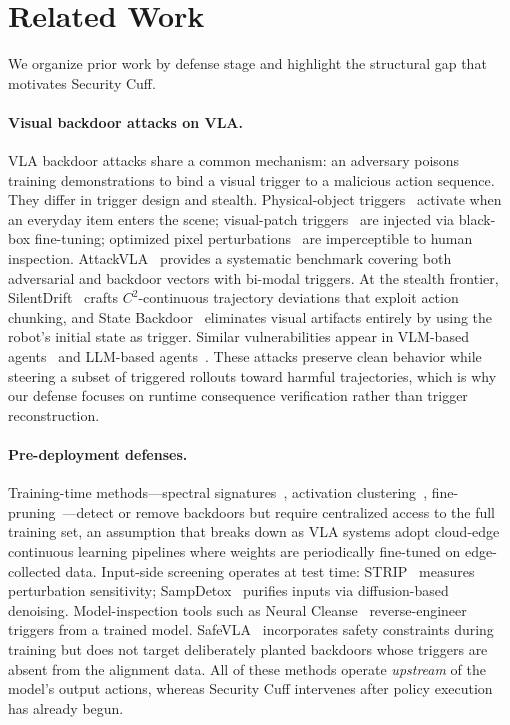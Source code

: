 \section{Related Work}
\label{sec:related}

We organize prior work by defense stage and highlight the
structural gap that motivates Security Cuff.

\paragraph{Visual backdoor attacks on VLA.}
VLA backdoor attacks share a common mechanism: an adversary poisons
training demonstrations to bind a visual trigger to a malicious
action sequence.
They differ in trigger design and stealth.
Physical-object triggers~\citep{goba} activate when an everyday
item enters the scene; visual-patch triggers~\citep{tabvla} are
injected via black-box fine-tuning; optimized pixel
perturbations~\citep{badvla} are imperceptible to human inspection.
AttackVLA~\citep{attackvla} provides a systematic benchmark
covering both adversarial and backdoor vectors with bi-modal
triggers.
At the stealth frontier,
SilentDrift~\citep{silentdrift} crafts $C^2$-continuous trajectory
deviations that exploit action chunking, and
State Backdoor~\citep{statebackdoor} eliminates visual artifacts
entirely by using the robot's initial state as trigger.
Similar vulnerabilities appear in VLM-based
agents~\citep{beat,trojanrobot} and LLM-based
agents~\citep{contextbackdoor}.
These attacks preserve clean behavior while steering a subset of
triggered rollouts toward harmful trajectories, which is why our
defense focuses on runtime consequence verification rather than
trigger reconstruction.

\paragraph{Pre-deployment defenses.}
Training-time methods---spectral
signatures~\citep{tran2018spectral}, activation
clustering~\citep{chen2019detecting},
fine-pruning~\citep{liu2018fine}---detect or remove backdoors but
require centralized access to the full training set, an assumption
that breaks down as VLA systems adopt cloud-edge continuous learning
pipelines where weights are periodically fine-tuned on
edge-collected data.
Input-side screening operates at test time:
STRIP~\citep{gao2019strip} measures perturbation sensitivity;
SampDetox~\citep{sampdetox} purifies inputs via diffusion-based
denoising.
Model-inspection tools such as Neural
Cleanse~\citep{wang2019neural} reverse-engineer triggers from a
trained model.
SafeVLA~\citep{safevla} incorporates safety constraints during
training but does not target deliberately planted backdoors whose
triggers are absent from the alignment data.
All of these methods operate \emph{upstream} of the model's output
actions, whereas Security Cuff intervenes after policy execution has
already begun.

